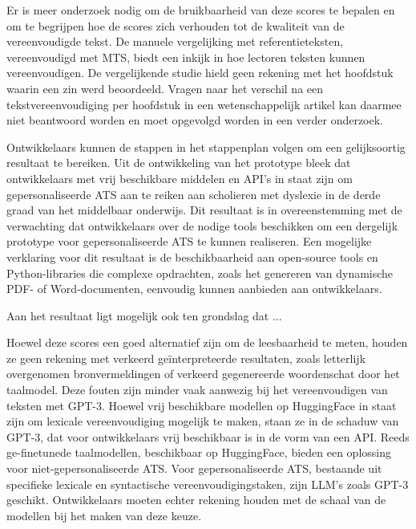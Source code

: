 



Er is meer onderzoek nodig om de bruikbaarheid van deze scores te bepalen en om te begrijpen hoe de scores zich verhouden tot de kwaliteit van de vereenvoudigde tekst. De manuele vergelijking met referentieteksten, vereenvoudigd met MTS, biedt een inkijk in hoe lectoren teksten kunnen vereenvoudigen. De vergelijkende studie hield geen rekening met het hoofdstuk waarin een zin werd beoordeeld. Vragen naar het verschil na een tekstvereenvoudiging per hoofdstuk in een wetenschappelijk artikel kan daarmee niet beantwoord worden en moet opgevolgd worden in een verder onderzoek.

\medspace

Ontwikkelaars kunnen de stappen in het stappenplan volgen om een gelijksoortig resultaat te bereiken. Uit de ontwikkeling van het prototype bleek dat ontwikkelaars met vrij beschikbare middelen en API's in staat zijn om gepersonaliseerde ATS aan te reiken aan scholieren met dyslexie in de derde graad van het middelbaar onderwijs. Dit resultaat is in overeenstemming met de verwachting dat ontwikkelaars over de nodige tools beschikken om een dergelijk prototype voor gepersonaliseerde ATS te kunnen realiseren. Een mogelijke verklaring voor dit resultaat is de beschikbaarheid aan open-source tools en Python-libraries die complexe opdrachten, zoals het genereren van dynamische PDF- of Word-documenten, eenvoudig kunnen aanbieden aan ontwikkelaars.



Aan het resultaat ligt mogelijk ook ten grondslag dat ...

Hoewel deze scores een goed alternatief zijn om de leesbaarheid te meten, houden ze geen rekening met verkeerd geïnterpreteerde resultaten, zoals letterlijk overgenomen bronvermeldingen of verkeerd gegenereerde woordenschat door het taalmodel. Deze fouten zijn minder vaak aanwezig bij het vereenvoudigen van teksten met GPT-3. Hoewel vrij beschikbare modellen op HuggingFace in staat zijn om lexicale vereenvoudiging mogelijk te maken, staan ze in de schaduw van GPT-3, dat voor ontwikkelaars vrij beschikbaar is in de vorm van een API. Reeds ge-finetunede taalmodellen, beschikbaar op HuggingFace, bieden een oplossing voor niet-gepersonaliseerde ATS. Voor gepersonaliseerde ATS, bestaande uit specifieke lexicale en syntactische vereenvoudigingstaken, zijn LLM's zoals GPT-3 geschikt. Ontwikkelaars moeten echter rekening houden met de schaal van de modellen bij het maken van deze keuze. 


